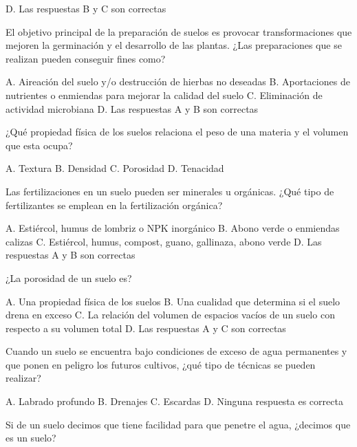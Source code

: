 \documentclass[11pt]{exam}
\begin{document}
{\begin{questions}
\begin{checkboxes}
    \CorrectChoice D. Las respuestas B y C son correctas
  \end{checkboxes}
\question El objetivo principal de la preparación de suelos es provocar transformaciones
  que mejoren la germinación y el desarrollo de las plantas. ¿Las preparaciones que se
  realizan pueden conseguir fines como?
  \begin{checkboxes}
    \choice A. Aireación del suelo y/o destrucción de hierbas no deseadas
    \choice B. Aportaciones de nutrientes o enmiendas para mejorar la calidad del suelo
    \choice C. Eliminación de actividad microbiana
    \CorrectChoice D. Las respuestas A y B son correctas
  \end{checkboxes} 
\question ¿Qué propiedad física de los suelos relaciona el peso de una materia y
  el volumen que esta ocupa?
  \begin{checkboxes}
    \choice A. Textura
    \CorrectChoice B. Densidad
    \choice C. Porosidad
    \choice D. Tenacidad
  \end{checkboxes}
\question Las fertilizaciones en un suelo pueden ser minerales u orgánicas. ¿Qué tipo
  de fertilizantes se emplean en la fertilización orgánica?
  \begin{checkboxes}
    \choice A. Estiércol, humus de lombriz o NPK inorgánico
    \choice B. Abono verde  o enmiendas calizas
    \CorrectChoice C. Estiércol, humus, compost, guano, gallinaza, abono verde
    \choice D. Las respuestas A y B son correctas
  \end{checkboxes}
\question ¿La porosidad de un suelo es?
  \begin{checkboxes}
    \choice A. Una propiedad física de los suelos
    \choice B. Una cualidad que determina si el suelo drena en exceso
    \choice C. La relación del volumen de espacios vacíos de un suelo con
    respecto a su volumen total
    \CorrectChoice D. Las respuestas A y C son correctas
  \end{checkboxes}
\question Cuando un suelo se encuentra bajo condiciones de exceso de agua
  permanentes y que ponen en peligro los futuros cultivos, ¿qué tipo de
  técnicas se pueden realizar?
  \begin{checkboxes}
    \choice A. Labrado profundo
    \CorrectChoice B. Drenajes
    \choice C. Escardas
    \choice D. Ninguna respuesta es correcta
  \end{checkboxes}
\question Si de un suelo decimos que tiene facilidad para que penetre el agua,
  ¿decimos que es un suelo?
  \begin{checkboxes}

\end{checkboxes}
\end{questions}}
\end{document}
